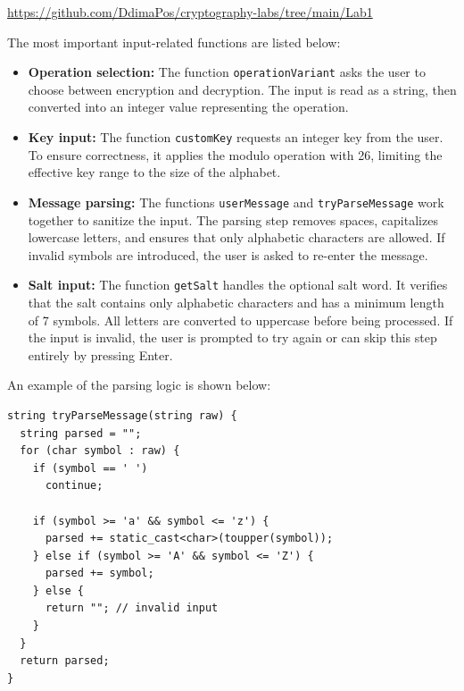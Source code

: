 \documentclass[12pt]{article}
\begin{document}
\begin{center}
\url{https://github.com/DdimaPos/cryptography-labs/tree/main/Lab1}
\end{center}

The most important input-related functions are listed below:

\begin{itemize}
    \item \textbf{Operation selection:} The function \texttt{operationVariant} asks the user to 
    choose between encryption and decryption. The input is read as a string, then converted into an 
    integer value representing the operation.

    \item \textbf{Key input:} The function \texttt{customKey} requests an integer key from the user. 
    To ensure correctness, it applies the modulo operation with 26, limiting the effective key range 
    to the size of the alphabet.

    \item \textbf{Message parsing:} The functions \texttt{userMessage} and \texttt{tryParseMessage} 
    work together to sanitize the input. The parsing step removes spaces, capitalizes lowercase letters, 
    and ensures that only alphabetic characters are allowed. If invalid symbols are introduced, the user 
    is asked to re-enter the message.

    \item \textbf{Salt input:} The function \texttt{getSalt} handles the optional salt word. It verifies 
    that the salt contains only alphabetic characters and has a minimum length of 7 symbols. All letters 
    are converted to uppercase before being processed. If the input is invalid, the user is prompted to 
    try again or can skip this step entirely by pressing Enter.
\end{itemize}

\noindent
An example of the parsing logic is shown below:

\begin{verbatim}
string tryParseMessage(string raw) {
  string parsed = "";
  for (char symbol : raw) {
    if (symbol == ' ')
      continue;

    if (symbol >= 'a' && symbol <= 'z') {
      parsed += static_cast<char>(toupper(symbol));
    } else if (symbol >= 'A' && symbol <= 'Z') {
      parsed += symbol;
    } else {
      return ""; // invalid input
    }
  }
  return parsed;
}
\end{verbatim}
\end{document}
